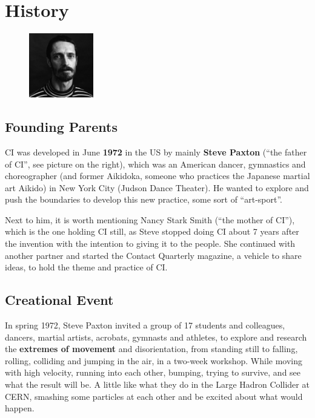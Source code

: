 \section{History}\label{sec:history}

\begin{figure}
\centering
\includegraphics[width=0.25\textwidth]{images/history}
\end{figure}

\subsection{Founding Parents}\label{subsec:founding-parents}

CI was developed in June \textbf{1972} in the US by mainly \textbf{Steve Paxton} (``the father of CI'', see picture on the right), which was an American dancer, gymnastics and choreographer (and former Aikidoka, someone who practices the Japanese martial art Aikido) in New York City (Judson Dance Theater).
He wanted to explore and push the boundaries to develop this new practice, some sort of ``art-sport''.

Next to him, it is worth mentioning Nancy Stark Smith (``the mother of CI''), which is the one holding CI still, as Steve stopped doing CI about 7 years after the invention with the intention to giving it to the people.
She continued with another partner and started the Contact Quarterly magazine, a vehicle to share ideas, to hold the theme and practice of CI.

\subsection{Creational Event}\label{subsec:creational-event}

In spring 1972, Steve Paxton invited a group of 17 students and colleagues, dancers, martial artists, acrobats, gymnasts and athletes, to explore and research the \textbf{extremes of movement} and disorientation, from standing still to falling, rolling, colliding and jumping in the air, in a two-week workshop.
While moving with high velocity, running into each other, bumping, trying to survive, and see what the result will be.
A little like what they do in the Large Hadron Collider at CERN, smashing some particles at each other and be excited about what would happen.

